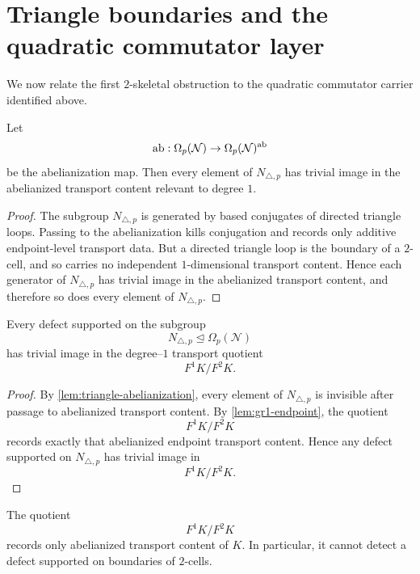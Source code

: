 \section{Triangle boundaries and the quadratic commutator layer}
We now relate the first \(2\)-skeletal obstruction to the quadratic
commutator carrier identified above.
\begin{lemma}
	\label{lem:triangle-abelianization}
	Let
	\[
		\operatorname{ab}:\Omega_p(\mathcal N)\to \Omega_p(\mathcal N)^{\operatorname{ab}}
	\]
	be the abelianization map.  Then every element of \(N_{\triangle,p}\) has
	trivial image in the abelianized transport content relevant to
	degree \(1\).
\end{lemma}
\begin{proof}
	The subgroup \(N_{\triangle,p}\) is generated by based conjugates of
	directed triangle loops.  Passing to the abelianization kills
	conjugation and records only additive endpoint-level transport data.
	But a directed triangle loop is the boundary of a \(2\)-cell, and so
	carries no independent \(1\)-dimensional transport content.  Hence each
	generator of \(N_{\triangle,p}\) has trivial image in the abelianized
	transport content, and therefore so does every element of
	\(N_{\triangle,p}\).
\end{proof}
\begin{corollary}
	\label{cor:triangle-degree1-invisible}
	Every defect supported on the subgroup
	\[
		N_{\triangle,p}\trianglelefteq \Omega_p(\mathcal N)
	\]
	has trivial image in the degree--\(1\) transport quotient
	\[
		F^1K/F^2K.
	\]
\end{corollary}
\begin{proof}
	By \cref{lem:triangle-abelianization}, every element of \(N_{\triangle,p}\)
	is invisible after passage to abelianized transport content.  By
	\cref{lem:gr1-endpoint}, the quotient
	\[
		F^1K/F^2K
	\]
	records exactly that abelianized endpoint transport content.  Hence any
	defect supported on \(N_{\triangle,p}\) has trivial image in
	\[
		F^1K/F^2K.
	\]
\end{proof}
\begin{lemma}
	\label{lem:gr1-endpoint}
	The quotient
	\[
		F^1K/F^2K
	\]
	records only abelianized transport content of \(K\).  In particular, it
	cannot detect a defect supported on boundaries of \(2\)-cells.
\end{lemma}
